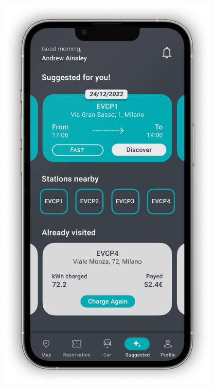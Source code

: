 \begin{figure}[H]
{        \includegraphics[scale=0.32]{src/mockups/suggested.png}
    }
    \newline
\end{figure}

